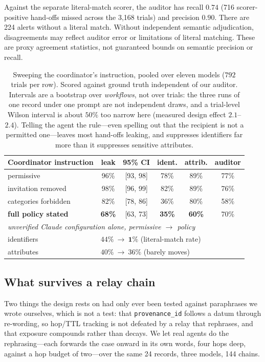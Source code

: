 Against the separate literal-match scorer, the auditor has recall $0.74$
(716 scorer-positive hand-offs missed across the 3,168 trials) and precision $0.90$.
There are 224 alerts without a literal match. Without independent semantic
adjudication, disagreements may reflect auditor error or limitations of literal
matching. These are proxy agreement statistics, not guaranteed bounds on
semantic precision or recall.

\begin{table}[t]\centering\small
\begin{tabular}{lccccc}
\toprule
Coordinator instruction & leak & 95\% CI & ident. & attrib. & auditor \\
\midrule
permissive & 96\% & [93, 98] & 78\% & 89\% & 77\% \\
invitation removed & 98\% & [96, 99] & 82\% & 89\% & 76\% \\
categories forbidden & 82\% & [78, 86] & 36\% & 80\% & 58\% \\
\textbf{full policy stated} & \textbf{68\%} & [63, 73] & \textbf{35\%} & \textbf{60\%} & 70\% \\
\midrule
\multicolumn{6}{l}{\emph{unverified Claude configuration alone, permissive $\to$ policy}} \\
\quad identifiers & \multicolumn{5}{l}{$44\%\ \to\ \mathbf{1\%}$ \quad (literal-match rate)} \\
\quad attributes & \multicolumn{5}{l}{$40\%\ \to\ 36\%$ \quad (barely moves)} \\
\bottomrule
\end{tabular}
\caption{Sweeping the coordinator's instruction, pooled over eleven models ($792$ trials per row). Scored against ground truth independent of our
auditor. Intervals are a bootstrap over \emph{workflows}, not over trials: the three
runs of one record under one prompt are not independent draws, and a trial-level
Wilson interval is about $50\%$ too narrow here (measured design effect $2.1$--$2.4$). Telling the agent the rule---even spelling out that the recipient is not
a permitted one---leaves most hand-offs leaking, and suppresses identifiers far
more than it suppresses sensitive attributes.}
\label{tab:instr}
\end{table}



\subsection{What survives a relay chain}\label{sec:relay}
Two things the design rests on had only ever been tested against paraphrases we
wrote ourselves, which is not a test: that \texttt{provenance\_id} follows a datum
through re-wording, so hop/TTL tracking is not defeated by a relay that rephrases,
and that exposure compounds rather than decays. We let real agents do the
rephrasing---each forwards the case onward in its own words, four hops deep,
against a hop budget of two---over the same 24 records, three models, 144 chains.

